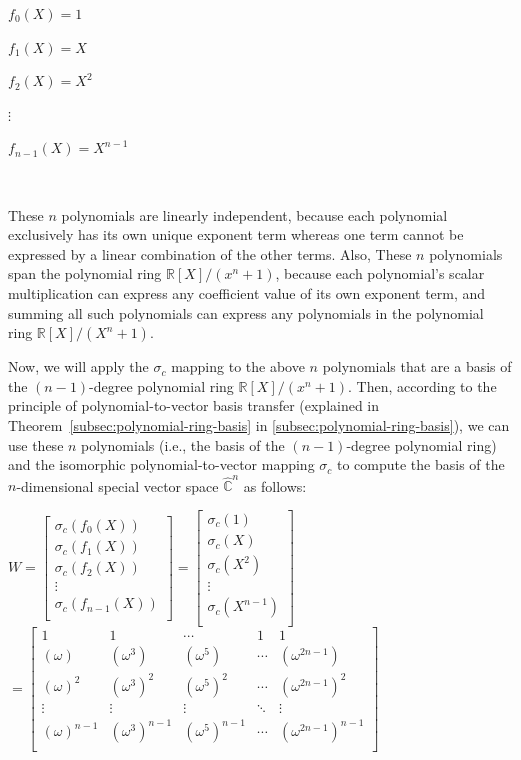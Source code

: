 $f_0(X) = 1$

$f_1(X) = X$

$f_2(X) = X^2$

$\vdots$

$f_{n-1}(X) = X^{n-1}$

$ $

These $n$ polynomials are linearly independent, because each polynomial exclusively has its own unique exponent term whereas one term cannot be expressed by a linear combination of the other terms. Also, These $n$ polynomials span the polynomial ring $\mathbb{R}[X]/(x^n + 1)$, because each polynomial's scalar multiplication can express any coefficient value of its own exponent term, and summing all such polynomials can express any polynomials in the polynomial ring $\mathbb{R}[X]/(X^n + 1)$.


Now, we will apply the $\sigma_c$ mapping to the above $n$ polynomials that are a basis of the $(n-1)$-degree polynomial ring $\mathbb{R}[X]/(x^n + 1)$. Then, according to the principle of polynomial-to-vector basis transfer (explained in Theorem~\ref*{subsec:polynomial-ring-basis} in \autoref{subsec:polynomial-ring-basis}), we can use these $n$ polynomials (i.e., the basis of the $(n-1)$-degree polynomial ring) and the isomorphic polynomial-to-vector mapping $\sigma_c$ to compute the basis of the $n$-dimensional special vector space $\hat{\mathbb C}^{n}$ as follows: 

$W = \begin{bmatrix}
\sigma_c(f_0(X)) \\
\sigma_c(f_1(X)) \\
\sigma_c(f_2(X)) \\
\vdots \\
\sigma_c(f_{n-1}(X)) \\
\end{bmatrix}
= \begin{bmatrix}
\sigma_c(1) \\
\sigma_c(X) \\
\sigma_c(X^2) \\
\vdots \\
\sigma_c(X^{n-1}) \\
\end{bmatrix}$
$= \begin{bmatrix}
1 & 1 & \cdots & 1 & 1\\
(\omega) & (\omega^3) & (\omega^5) & \cdots & (\omega^{2n-1})\\
(\omega)^2 & (\omega^3)^2 & (\omega^5)^2 & \cdots & (\omega^{2n-1})^2\\
\vdots & \vdots & \vdots & \ddots & \vdots \\
(\omega)^{n-1} & (\omega^3)^{n-1} & (\omega^5)^{n-1} & \cdots & (\omega^{2n-1})^{n-1}\\
\end{bmatrix}$

